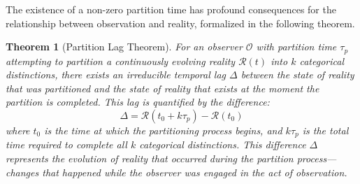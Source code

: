 \documentclass[12pt,a4paper]{article}
\newtheorem{theorem}{Theorem}[section]
\theoremstyle{definition}
\theoremstyle{remark}
\begin{document}
The existence of a non-zero partition time has profound consequences for the relationship between observation and reality, formalized in the following theorem.

\begin{theorem}[Partition Lag Theorem]
\label{thm:partition_lag}
For an observer $\mathcal{O}$ with partition time $\tau_p$ attempting to partition a continuously evolving reality $\mathcal{R}(t)$ into $k$ categorical distinctions, there exists an irreducible temporal lag $\Delta$ between the state of reality that was partitioned and the state of reality that exists at the moment the partition is completed. This lag is quantified by the difference:
\begin{equation}
    \Delta = \mathcal{R}(t_0 + k\tau_p) - \mathcal{R}(t_0)
\end{equation}
where $t_0$ is the time at which the partitioning process begins, and $k\tau_p$ is the total time required to complete all $k$ categorical distinctions. This difference $\Delta$ represents the evolution of reality that occurred during the partition process—changes that happened while the observer was engaged in the act of observation.
\end{theorem}
\end{document}
